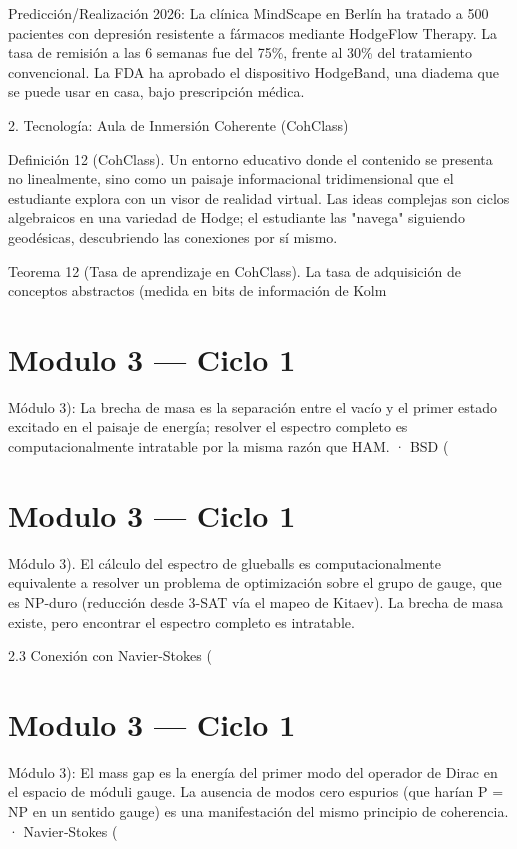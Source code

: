 \documentclass[12pt,twoside]{book}
\begin{document}
Predicción/Realización 2026: La clínica MindScape en Berlín ha tratado a 500 pacientes con depresión resistente a fármacos mediante HodgeFlow Therapy. La tasa de remisión a las 6 semanas fue del 75\%, frente al 30\% del tratamiento convencional. La FDA ha aprobado el dispositivo HodgeBand, una diadema que se puede usar en casa, bajo prescripción médica.

2. Tecnología: Aula de Inmersión Coherente (CohClass)

Definición 12 (CohClass). Un entorno educativo donde el contenido se presenta no linealmente, sino como un paisaje informacional tridimensional que el estudiante explora con un visor de realidad virtual. Las ideas complejas son ciclos algebraicos en una variedad de Hodge; el estudiante las "navega" siguiendo geodésicas, descubriendo las conexiones por sí mismo.

Teorema 12 (Tasa de aprendizaje en CohClass). La tasa de adquisición de conceptos abstractos (medida en bits de información de Kolm



\chapter{Modulo 3 — Ciclo 1}
Módulo 3): La brecha de masa es la separación entre el vacío y el primer estado excitado en el paisaje de energía; resolver el espectro completo es computacionalmente intratable por la misma razón que HAM.
· BSD (

\chapter{Modulo 3 — Ciclo 1}
Módulo 3).
El cálculo del espectro de glueballs es computacionalmente equivalente a resolver un problema de optimización sobre el grupo de gauge, que es NP-duro (reducción desde 3-SAT vía el mapeo de Kitaev). La brecha de masa existe, pero encontrar el espectro completo es intratable.

2.3 Conexión con Navier-Stokes (

\chapter{Modulo 3 — Ciclo 1}
Módulo 3): El mass gap es la energía del primer modo del operador de Dirac en el espacio de móduli gauge. La ausencia de modos cero espurios (que harían P = NP en un sentido gauge) es una manifestación del mismo principio de coherencia.
· Navier‑Stokes (
\end{document}
